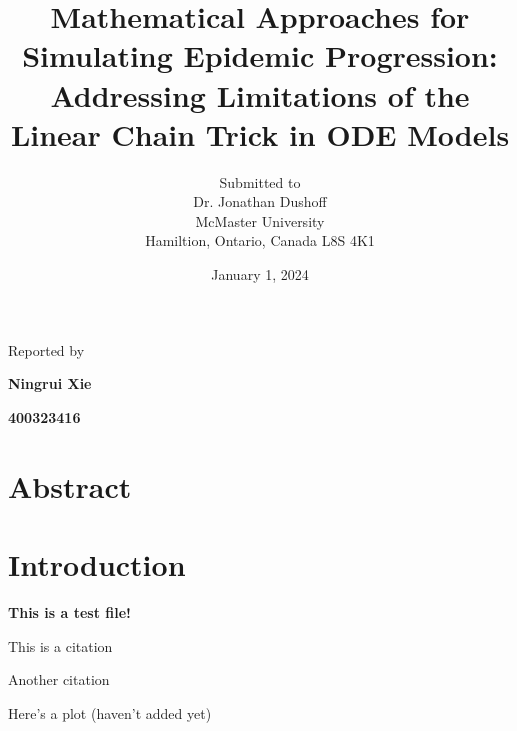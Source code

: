\documentclass[12pt]{article}
\begin{document}
\title{Mathematical Approaches for Simulating Epidemic Progression: Addressing Limitations of the Linear Chain Trick in ODE Models}

\author{Submitted to\\ Dr. Jonathan Dushoff 
\\McMaster University\\Hamiltion, Ontario, Canada L8S 4K1}
\date {January 1, 2024}
\maketitle


\centerline{Reported by}
\centerline{\textbf{Ningrui Xie}}
\centerline{\textbf{400323416}}


\newpage
\section{Abstract}

\section{Introduction}
\textbf{This is a test file!} 

This is a citation \cite{Feng2016} 

Another citation \cite{Anderson1991} 

Here's a plot (haven't added yet)





 
\end{document}
